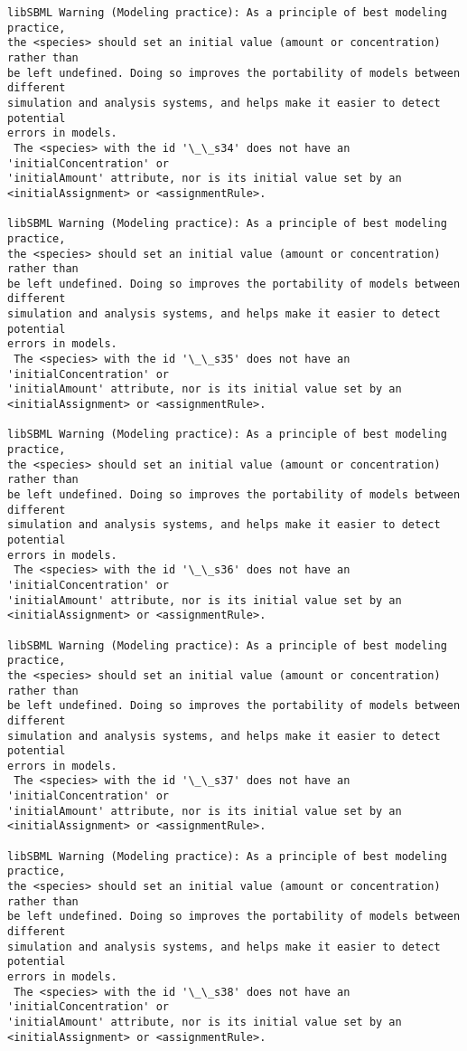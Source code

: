 \documentclass[11pt]{article}
\begin{document}
\begin{Verbatim}[commandchars=\\\{\}]
libSBML Warning (Modeling practice): As a principle of best modeling practice,
the <species> should set an initial value (amount or concentration) rather than
be left undefined. Doing so improves the portability of models between different
simulation and analysis systems, and helps make it easier to detect potential
errors in models.
 The <species> with the id '\_\_s34' does not have an 'initialConcentration' or
'initialAmount' attribute, nor is its initial value set by an
<initialAssignment> or <assignmentRule>.

libSBML Warning (Modeling practice): As a principle of best modeling practice,
the <species> should set an initial value (amount or concentration) rather than
be left undefined. Doing so improves the portability of models between different
simulation and analysis systems, and helps make it easier to detect potential
errors in models.
 The <species> with the id '\_\_s35' does not have an 'initialConcentration' or
'initialAmount' attribute, nor is its initial value set by an
<initialAssignment> or <assignmentRule>.

libSBML Warning (Modeling practice): As a principle of best modeling practice,
the <species> should set an initial value (amount or concentration) rather than
be left undefined. Doing so improves the portability of models between different
simulation and analysis systems, and helps make it easier to detect potential
errors in models.
 The <species> with the id '\_\_s36' does not have an 'initialConcentration' or
'initialAmount' attribute, nor is its initial value set by an
<initialAssignment> or <assignmentRule>.

libSBML Warning (Modeling practice): As a principle of best modeling practice,
the <species> should set an initial value (amount or concentration) rather than
be left undefined. Doing so improves the portability of models between different
simulation and analysis systems, and helps make it easier to detect potential
errors in models.
 The <species> with the id '\_\_s37' does not have an 'initialConcentration' or
'initialAmount' attribute, nor is its initial value set by an
<initialAssignment> or <assignmentRule>.

libSBML Warning (Modeling practice): As a principle of best modeling practice,
the <species> should set an initial value (amount or concentration) rather than
be left undefined. Doing so improves the portability of models between different
simulation and analysis systems, and helps make it easier to detect potential
errors in models.
 The <species> with the id '\_\_s38' does not have an 'initialConcentration' or
'initialAmount' attribute, nor is its initial value set by an
<initialAssignment> or <assignmentRule>.


\end{Verbatim}
\end{document}
